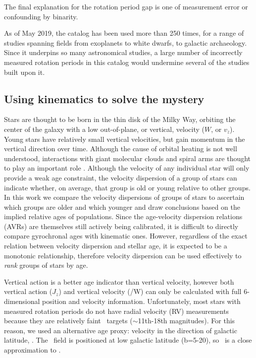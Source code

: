 The final explanation for the rotation period gap is one of measurement error
or confounding by binarity.

As of May 2019, the \citet{mcquillan2014} catalog has been used more than 250
times, for a range of studies spanning fields from exoplanets to white dwarfs,
to galactic archaeology.
Since it underpins so many astronomical studies, a large number of incorrectly
measured rotation periods in this catalog would undermine several of the
studies built upon it.

\subsection{Using kinematics to solve the mystery}

Stars are thought to be born in the thin disk of the Milky Way, orbiting the
center of the galaxy with a low out-of-plane, or vertical, velocity ($W$, or
$v_z$).
Young stars have relatively small vertical velocities, but gain momentum in
the vertical direction over time.
Although the cause of orbital heating is not well understood, interactions
with giant molecular clouds and spiral arms are thought to play an important
role .
Although the velocity of any individual star will only provide a weak age
constraint, the velocity dispersion of a group of stars can indicate whether,
on average, that group is old or young relative to other groups.
In this work we compare the velocity dispersions of groups of stars to
ascertain which groups are older and which younger and draw conclusions based
on the implied relative ages of populations.
Since the age-velocity dispersion relations (AVRs) are themselves still
actively being calibrated, it is difficult to directly compare gyrochronal
ages with kinematic ones.
However, regardless of the exact relation between velocity dispersion and
stellar age, it is expected to be a monotonic relationship, therefore velocity
dispersion can be used effectively to {\it rank} groups of stars by age.

Vertical action is a better age indicator than vertical velocity, however both
vertical action ($J_z$) and vertical velocity (\vz/W) can only be calculated
with full 6-dimensional position and velocity information.
Unfortunately, most stars with measured rotation periods do not have radial
velocity (RV) measurements because they are relatively faint \kepler\ targets
($\sim$11th-18th magnitudes).
For this reason, we used an alternative age proxy: velocity in the direction
of galactic latitude, \vb.
The \kepler\ field is positioned at low galactic latitude (b=5-20\degrees), so
\vb\ is a close approximation to \vz.

